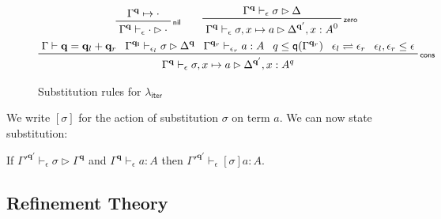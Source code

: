 \documentclass[acmsmall,screen,review]{acmart}
\newcommand{\mb}[1]{\ensuremath{\mathbf{#1}}}
\newcommand{\ms}[1]{\ensuremath{\mathsf{#1}}}
\newcommand{\qsp}[4]{#1 \vdash #2 = #3 + #4}
\newcommand{\cwk}[2]{#1 \mapsto #2}
\newcommand{\rle}[1]{{\scriptsize\textsf{#1}}}
\newcommand{\hasty}[4]{#1 \vdash_{#2} #3: {#4}}
\newcommand{\issubst}[4]{#1 \vdash_{#2} #3 \rhd #4}
\newcommand{\subiterexp}{\texorpdfstring{\(\lambda_{\ms{iter}}\)}{lambda-iter}}
\newcommand{\slides}{\rightleftharpoons}
\newcommand{\alquant}{\ms{q}}
\begin{document}
\begin{figure}
  \begin{adjustbox}{minipage=1.1\textwidth,scale=0.9}
  \begin{gather*}
    \prftree[r]{\rle{nil}}{\cwk{\Gamma^{\mb{q}}}{\cdot}}
                              {\issubst{\Gamma^{\mb{q}}}{\epsilon}{\cdot}{\cdot}} \qquad 
    \prftree[r]{\rle{zero}}
      {\issubst{\Gamma^{\mb{q}}}{\epsilon}{\sigma}{\Delta}}
      {\issubst{\Gamma^{\mb{q}}}{\epsilon}{\sigma, x \mapsto a}{\Delta^{\mb{q}'}, x : A^0}}
    \\
    \prftree[r]{\rle{cons}}
      {\qsp{\Gamma}{\mb{q}}{\mb{q}_l}{\mb{q}_r}}
      {\issubst{\Gamma^{\mb{q_l}}}{\epsilon_l}{\sigma}{\Delta^{\mb{q}}}}
      {\hasty{\Gamma^{\mb{q}_r}}{\epsilon_r}{a}{A}}
      {q \leq \alquant(\Gamma^{\mb{q}_r})}
      {\epsilon_l \slides \epsilon_r}
      {\epsilon_l, \epsilon_r \leq \epsilon}
      {\issubst{\Gamma^{\mb{q}}}{\epsilon}{\sigma, x \mapsto a}
      {\Delta^{\mb{q}'}, x : A^q}}
  \end{gather*}
  \end{adjustbox}
  \caption{Substitution rules for \subiterexp{}}
  \Description{}
  \label{fig:expr-subst}
\end{figure}%
We write $[\sigma]$ for the action of substitution $\sigma$ on term $a$. We can now state
substitution:
\begin{lemma}[name=Substitution, restate=synmonsubst]
  If ${\issubst{\Gamma'^{\mb{q}'}}{\epsilon}{\sigma}{\Gamma^{\mb{q}}}}$
  and ${\hasty{\Gamma^{\mb{q}}}{\epsilon}{a}{A}}$
  then ${\hasty{\Gamma'^{\mb{q}'}}{\epsilon}{[\sigma]a}{A}}$. 
\end{lemma}

\subsection{Refinement Theory}

\label{ssec:refinement-theory}
\end{document}
